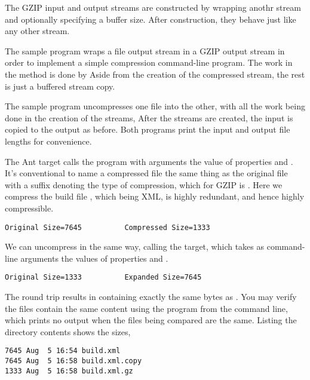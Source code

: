 The GZIP input and output streams are constructed by wrapping anothr
stream and optionally specifying a buffer size.  After construction,
they behave just like any other stream. 

The sample program  wraps a file output
stream in a GZIP output stream in order to implement
a simple compression command-line program.  The work
in the  method is done by
%
%
Aside from the creation of the compressed stream, the
rest is just a buffered stream copy.  

The sample program  uncompresses one
file into the other, with all the work being done in
the creation of the streams,
%
%
After the streams are created, the input is copied to the output as
before.  Both programs print the input and output file lengths
for convenience.

The Ant target  calls the program with arguments
the value of properties  and .
It's conventional to name a compressed file the same thing as the
original file with a suffix denoting the type of compression,
which for GZIP is . Here we compress the build file
, which being XML, is highly redundant, and hence
highly compressible.
%
\begin{verbatim}
Original Size=7645          Compressed Size=1333 
\end{verbatim}
%
We can uncompress in the same way, calling the 
target, which takes as command-line arguments the values of properties
 and .
%
\begin{verbatim}
Original Size=1333          Expanded Size=7645
\end{verbatim}
%
The round trip results in  containing exactly the
same bytes as .  You may verify the files contain the
same content using the  program from the command line,
%
%
which prints no output when the files being compared are the same.
Listing the directory contents shows the sizes,
%
\begin{verbatim}
7645 Aug  5 16:54 build.xml        
7645 Aug  5 16:58 build.xml.copy
1333 Aug  5 16:58 build.xml.gz
\end{verbatim}

